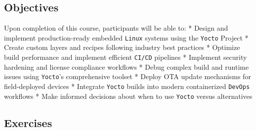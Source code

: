 \documentclass[
]{article}
\begin{document}
\subsection{Objectives}\label{objectives}

Upon completion of this course, participants will be able to: * Design
and implement production-ready embedded \texttt{Linux} systems using the
\texttt{Yocto} Project * Create custom layers and recipes following
industry best practices * Optimize build performance and implement
efficient \texttt{CI/CD} pipelines * Implement security hardening and
license compliance workflows * Debug complex build and runtime issues
using \texttt{Yocto}'s comprehensive toolset * Deploy OTA update
mechanisms for field-deployed devices * Integrate \texttt{Yocto} builds
into modern containerized \texttt{DevOps} workflows * Make informed
decisions about when to use \texttt{Yocto} versus alternatives

\subsection{Exercises}\label{exercises}
\end{document}
